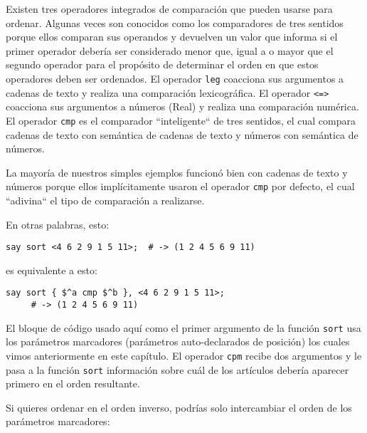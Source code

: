 Existen tres operadores integrados de comparación que pueden
usarse para ordenar. Algunas veces son conocidos como los
comparadores de tres sentidos porque ellos comparan sus operandos
y devuelven un valor que informa si el primer operador debería
ser considerado menor que, igual a o mayor que el segundo operador
para el propósito de determinar el orden en que estos operadores
deben ser ordenados.  El operador {\tt leg} coacciona sus argumentos
a cadenas de texto y realiza una comparación lexicográfica. El operador
\verb|<=>| coacciona sus argumentos a números (Real) y realiza una
comparación numérica. El operador {\tt cmp} es el comparador ``inteligente``
de tres sentidos, el cual compara cadenas de texto con semántica de 
cadenas de texto y números con semántica de números.

La mayoría de nuestros simples ejemplos funcionó bien
con cadenas de texto y números porque ellos implícitamente
usaron el operador {\tt cmp} por defecto, el cual ``adivina``
el tipo de comparación a realizarse.

\ifplastex \else
{}
\fi


En otras palabras, esto:

\begin{lstlisting}
say sort <4 6 2 9 1 5 11>;  # -> (1 2 4 5 6 9 11)
\end{lstlisting}

es equivalente a esto:

\begin{lstlisting}
say sort { $^a cmp $^b }, <4 6 2 9 1 5 11>;
     # -> (1 2 4 5 6 9 11)
\end{lstlisting}

El bloque de código usado aquí como el primer argumento
de la función {\tt sort} usa los parámetros marcadores
(parámetros auto-declarados de posición) los cuales
vimos anteriormente en este capítulo. El operador
{\tt cpm} recibe dos argumentos y le pasa a la
función {\tt sort}  información sobre cuál de los 
artículos debería aparecer primero en el orden 
resultante.

Si quieres ordenar en el orden inverso, podrías solo
intercambiar el orden de los parámetros marcadores:

